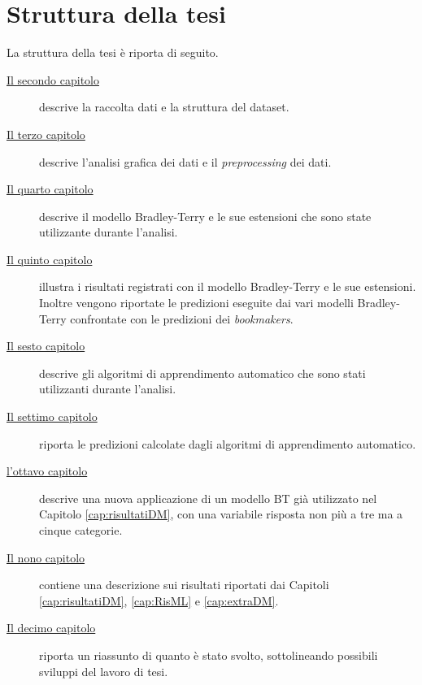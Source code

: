 \section{Struttura della tesi}
La struttura della tesi è riporta di seguito.
\begin{description}

\item[{\hyperref[cap:dataset]{Il secondo capitolo}}] descrive la raccolta dati e la struttura del dataset. 
\item[{\hyperref[cap:Analisi]{Il terzo capitolo}}] descrive l'analisi grafica dei dati e il \emph{preprocessing} dei dati. 
\item[{\hyperref[cap:BT]{Il quarto capitolo}}] descrive il modello Bradley-Terry e le sue estensioni che sono state utilizzante durante l'analisi.
\item[{\hyperref[cap:risultatiDM]{Il quinto capitolo}}] illustra i risultati registrati con il modello Bradley-Terry e le sue estensioni. Inoltre vengono riportate le predizioni eseguite dai vari modelli Bradley-Terry confrontate con le predizioni dei \emph{bookmakers}.
\item[{\hyperref[cap:ML]{Il sesto capitolo}}] descrive gli algoritmi di apprendimento automatico che sono stati utilizzanti durante l'analisi.
\item[{\hyperref[cap:RisML]{Il settimo capitolo}}] riporta le predizioni calcolate dagli algoritmi di apprendimento automatico.
\item[{\hyperref[cap:extraDM]{l'ottavo capitolo}}] descrive una nuova applicazione di un modello BT già utilizzato nel Capitolo \ref{cap:risultatiDM}, con una variabile risposta non più a tre ma a cinque categorie.
\item[{\hyperref[cap:precls]{Il nono capitolo}}] contiene una descrizione sui risultati riportati dai Capitoli \ref{cap:risultatiDM}, \ref{cap:RisML} e \ref{cap:extraDM}. 
\item[{\hyperref[cap:conclusioni]{Il decimo capitolo}}] riporta un riassunto di quanto è stato svolto, sottolineando possibili sviluppi del lavoro di tesi.
\end{description}





\begin{comment}
\begin{figure}[h]
	\begin{center}
		\texttt{[image: Logo\_azzurrodigite.png]}
		\caption{Logo di AzzurroDigitale}
	\end{center}
\end{figure}	contenuto...
\end{comment}


